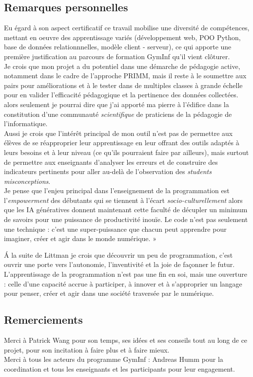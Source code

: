 \documentclass[11pt,a4paper]{article}
\let\cite\parencite
\begin{document}
\subsection*{Remarques personnelles}
Eu égard à son aspect certificatif ce travail mobilise une diversité de compétences, mettant en oeuvre des apprentissage variés (développement web, POO Python, base de données relationnnelles, modèle client - serveur), ce qui apporte une première justification au parcours de formation GymInf qu'il vient clôturer.\\
Je crois que mon projet a du potentiel dans une démarche de pédagogie active, notamment dans le cadre de l'approche PRIMM, mais il reste à le soumettre aux pairs pour améliorations et à le tester dans de multiples classes à grande échelle pour en valider l'efficacité pédagogique et la pertinence des données collectées. alors seulement je pourrai dire que j'ai apporté ma pierre à l'édifice dans la constitution d'une communauté \textit{scientifique} de praticiens de la pédagogie de l'informatique. \\
Aussi je crois que l'intérêt principal de mon outil n'est pas de permettre aux élèves de se réapproprier leur apprentissage en leur offrant des outils adaptés à leurs besoins et à leur niveau (ce qu'ils pourraient faire par ailleurs), mais surtout de permettre aux enseignants d'analyser les erreurs et de construire des indicateurs pertinents pour aller au-delà de l'observation des \textit{students misconceptions}.\\
Je pense que l'enjeu principal dans l'enseignement de la programmation est l'\textit{empowerment} des débutants qui se tiennent à l'écart \textit{socio-culturellement} alors que les IA génératives donnent maintenant cette faculté de décupler un minimum de savoirs pour une puissance de productivité inouïe. Le code n’est pas seulement une technique : c’est une super-puissance que chacun peut apprendre pour imaginer, créer et agir dans le monde numérique. »

\'A la suite de Littman \cite{codetojoy} je crois que découvrir un peu de programmation, c'est ouvrir une porte vers l'autonomie, l'inventivité et la joie de façonner le futur. L'apprentissage de la programmation n'est pas une fin en soi, mais une ouverture : celle d'une capacité accrue à participer, à innover et à s'approprier un langage pour penser, créer et agir dans une société traversée par le numérique.


\subsection*{Remerciements}
Merci à Patrick Wang pour son temps, ses idées et ses conseils tout au long de ce projet, pour son incitation à faire plus et à faire mieux.\\
Merci à tous les acteurs du programme GymInf : Andreas Humm pour la coordination et tous les enseignants et les participants pour leur engagement.
\end{document}
